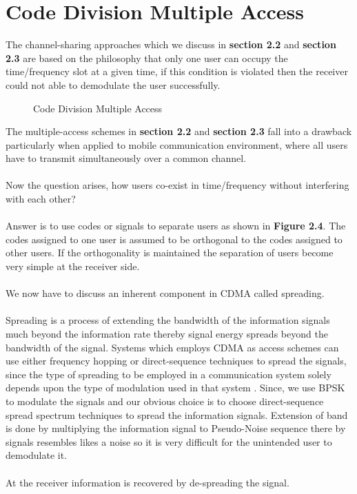 \section{Code Division Multiple Access}
The channel-sharing approaches which we discuss in \textbf{section 2.2} and \textbf{section 2.3} are based on the philosophy that only one user can occupy the time/frequency slot at a given time, if this condition is violated then the receiver could not able to demodulate the user successfully.
\begin{figure}[htb]
  \centerline{  }
  \caption{Code Division Multiple Access}
\end{figure}
The multiple-access schemes in \textbf{section 2.2} and \textbf{section 2.3} fall into a drawback particularly when applied to mobile communication environment, where all users have to transmit simultaneously over a common channel. \\ \\
Now the question arises, how users co-exist in time/frequency without interfering with each other? \\ \\
Answer is to use codes or signals to separate users as shown in \textbf{Figure 2.4}. The codes assigned to one user is assumed to be orthogonal to the codes assigned to other users. If the orthogonality is maintained the separation of users become very simple at the receiver side.\\ \\
We now have to discuss an inherent component in CDMA called spreading. \\ \\
Spreading is a process of extending the bandwidth of the information signals much beyond the information rate thereby signal energy spreads beyond the bandwidth of the signal. Systems which employs CDMA as access schemes can use either frequency hopping or direct-sequence techniques to spread the signals, since the type of spreading to be employed in a communication system solely depends upon the type of modulation used in that system \cite{Pro01}. Since, we use BPSK to modulate the signals and our obvious choice is to choose direct-sequence spread spectrum techniques to spread the information signals. Extension of band is done by multiplying the information signal to Pseudo-Noise sequence there by signals resembles likes a noise so it is very difficult for the unintended user to demodulate it.\\ \\
At the receiver information is recovered by de-spreading the signal.
